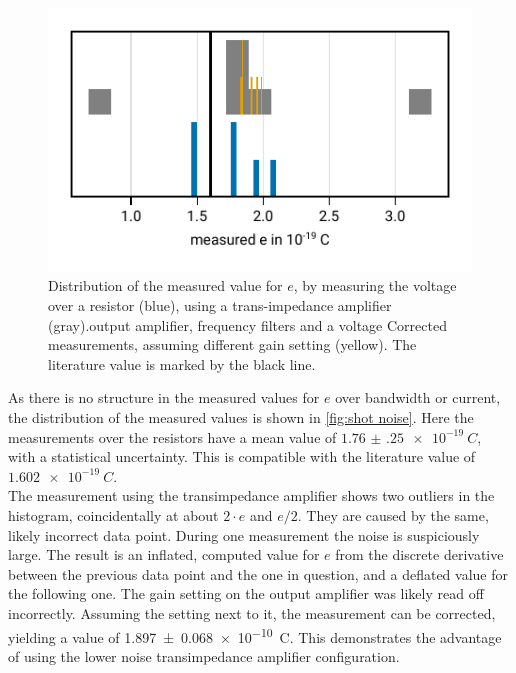 \documentclass[
    parskip=half, 
    twoside=false,
    twocolumn=true,
    fontsize=11pt,
]{scrarticle}
\begin{document}
\begin{figure}
    \centering
    \includegraphics{figures/03 shot noise.pdf}
    \caption{
        Distribution of the measured value for $e$, by measuring the voltage over a resistor (blue), using a trans-impedance amplifier (gray).output amplifier, frequency filters and a voltage
        Corrected measurements, assuming different gain setting (yellow). 
        The literature value is marked by the black line.
    }
    \label{fig:shot noise}
\end{figure}

As there is no structure in the measured values for $e$ over bandwidth or current, the distribution of the measured values is shown in \autoref{fig:shot noise}.
Here the measurements over the resistors have a mean value of $\SI{1.76(25)e-19}{C}$, with a statistical uncertainty.
This is compatible with the literature value of $\SI{1.602e-19}{C}$.\\
The measurement using the transimpedance amplifier shows two outliers in the histogram, coincidentally at about $2 \cdot e$ and $e/2$.
They are caused by the same, likely incorrect data point. During one measurement the noise is suspiciously large. The result is an inflated, computed value for $e$ from the discrete derivative between the previous data point and the one in question, and a deflated value for the following one. The gain setting on the output amplifier was likely read off incorrectly. 
Assuming the setting next to it, the measurement can be corrected, yielding a value of \SI{1.897(68)e-10}{C}.
This demonstrates the advantage of using the lower noise transimpedance amplifier configuration.
\end{document}

